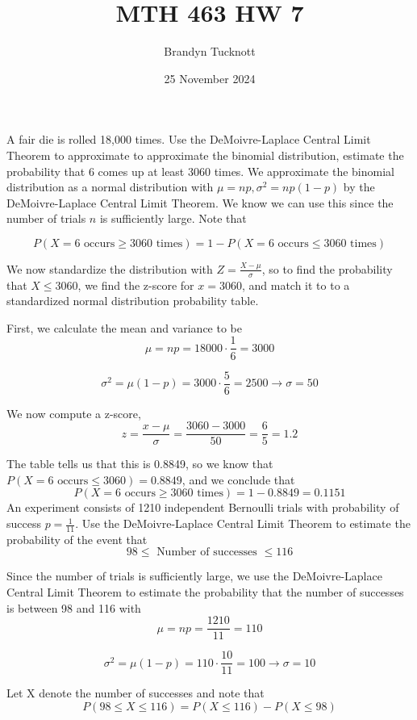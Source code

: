 \documentclass{exam}
\title{MTH 463 HW 7}
\author{Brandyn Tucknott}
\date{25 November 2024}
\begin{document}
\maketitle

\begin{questions}
    \question
A fair die is rolled 18,000 times. Use the DeMoivre-Laplace Central Limit Theorem to approximate to approximate the binomial distribution, estimate the probability that 6 comes up at least 3060 times.
\sol
We approximate the binomial distribution as a normal distribution with $\mu = np, \sigma^2 = np(1 - p)$ by the DeMoivre-Laplace Central Limit Theorem. We know we can use this since the number of trials $n$ is sufficiently large. Note that

$$P(X = 6 \text{ occurs} \geq 3060 \text{ times}) = 1 - P(X = 6 \text{ occurs} \leq 3060 \text{ times})$$

We now standardize the distribution with $Z = \frac{X - \mu}{\sigma}$, so to find the probability that $X \leq 3060$, we find the z-score for $x = 3060$, and match it to to a standardized normal distribution probability table.

First, we calculate the mean and variance to be
$$\mu = np = 18000\cdot \frac{1}{6} = 3000$$

$$\sigma^2 = \mu(1 - p) = 3000 \cdot \frac{5}{6} = 2500 \rightarrow \sigma = 50$$

We now compute a z-score,
$$z = \frac{x - \mu}{\sigma} = \frac{3060 - 3000}{50} = \frac{6}{5} = 1.2$$

The table tells us that this is 0.8849, so we know that $P(X = 6 \text{ occurs} \leq 3060) = 0.8849$, and we conclude that
$$P(X = 6 \text{ occurs} \geq 3060 \text{ times}) = 1 - 0.8849 = 0.1151$$
\newpage
\question
An experiment consists of 1210 independent Bernoulli trials with probability of success $p = \frac{1}{11}$. Use the DeMoivre-Laplace Central Limit Theorem to estimate the probability of the event that 
$$98 \leq\text{ Number of successes } \leq 116$$

\sol
Since the number of trials is sufficiently large, we use the DeMoivre-Laplace Central Limit Theorem to estimate the probability that the number of successes is between 98 and 116 with
$$\mu = np = \frac{1210}{11} = 110$$

$$\sigma^2 = \mu(1 - p) = 110\cdot \frac{10}{11} = 100 \rightarrow \sigma = 10$$

Let X denote the number of successes and note that
$$P(98 \leq X \leq 116) = P(X \leq 116) - P(X \leq 98)$$


\end{questions}
\end{document}
